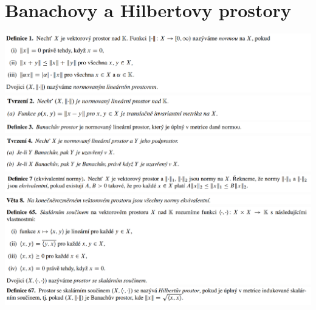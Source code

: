 \documentclass[12pt,a4paper]{article}
\begin{document}
\section{Banachovy a Hilbertovy prostory}
	\begin{center}
		\includegraphics[width=\textwidth]{img/2banHilb/2020-06-20 17 15 17.png}\vspace{0.3cm}
		\includegraphics[width=\textwidth]{img/2banHilb/2020-06-20 17 15 31.png}\vspace{0.3cm}
		\includegraphics[width=\textwidth]{img/2banHilb/2020-06-20 17 15 40.png}\vspace{0.3cm}
		\includegraphics[width=\textwidth]{img/2banHilb/2020-06-20 17 15 47.png}\vspace{0.3cm}
		\includegraphics[width=\textwidth]{img/2banHilb/2020-06-20 17 16 15.png}\vspace{0.3cm}
		\includegraphics[width=\textwidth]{img/2banHilb/2020-06-20 17 16 21.png}\vspace{0.3cm}
		\includegraphics[width=\textwidth]{img/2banHilb/2020-06-20 17 18 30.png}\vspace{0.3cm}
		\includegraphics[width=\textwidth]{img/2banHilb/2020-06-20 17 18 49.png}\vspace{0.3cm}

\end{center}
\end{document}

